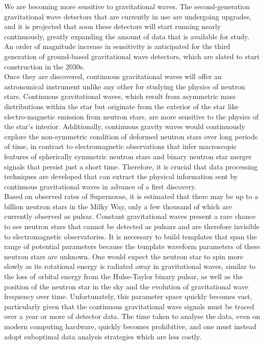We are becoming more sensitive to gravitational waves. The second-generation gravitational wave detectors that are currently in use are undergoing upgrades, and it is projected that soon these detectors will start running nearly continuously, greatly expanding the amount of data that is available for study. An order of magnitude increase in sensitivity is anticipated for the third generation of ground-based gravitational wave detectors, which are slated to start construction in the 2030s.\\

Once they are discovered, continuous gravitational waves will offer an astronomical instrument unlike any other for studying the physics of neutron stars. Continuous gravitational waves, which result from asymmetric mass distributions within the star but originate from the exterior of the star like electro-magnetic emission from neutron stars, are more sensitive to the physics of the star's interior. Additionally, continuous gravity waves would continuously explore the non-symmetric condition of deformed neutron stars over long periods of time, in contrast to electromagnetic observations that infer macroscopic features of spherically symmetric neutron stars and binary neutron star merger signals that persist just a short time. Therefore, it is crucial that data processing techniques are developed that can extract the physical information sent by continuous gravitational waves in advance of a first discovery.\\

Based on observed rates of Supernovae, it is estimated that there may be up to a billion neutron stars in the Milky Way, only a few thousand of which are currently observed as pulsar.  Constant gravitational waves present a rare chance to see neutron stars that cannot be detected as pulsars and are therefore invisible to electromagnetic observatories. It is necessary to build templates that span the range of potential parameters because the template waveform parameters of these neutron stars are unknown. One would expect the neutron star to spin more slowly as its rotational energy is radiated away in gravitational waves, similar to the loss of orbital energy from the Hulse-Taylor binary pulsar, as well as the position of the neutron star in the sky and the evolution of gravitational wave frequency over time. Unfortunately, this parameter space quickly becomes vast, particularly given that the continuous gravitational wave signals must be traced over a year or more of detector data. The time taken to analyse the data, even on modern computing hardware, quickly becomes prohibitive, and one must instead adopt suboptimal data analysis strategies which are less costly.\\

